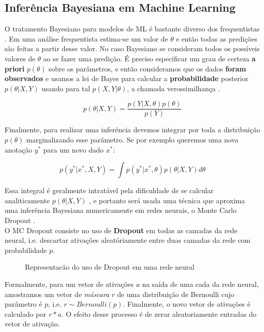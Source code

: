 \subsection{Inferência Bayesiana em Machine Learning}

O tratamento Bayesiano para modelos de ML é bastante diverso dos frequentistas \citep{dlbook}.
Em uma análise frequentista estima-se um valor de $\theta$ e então todas as
predições são feitas a partir desse valor. No caso Bayesiano se consideram todos
os possíveis valores de $\theta$ ao se fazer uma predição. É preciso especificar
um grau de certeza \textbf{a priori} $p(\theta)$ sobre os parâmetros, e então
consideramos que os dados \textbf{foram observados} e usamos a lei de Bayes para
calcular a \textbf{probabilidade} posterior $p(\theta | X,Y)$ usando para tal
$p(X,Y | \theta)$, a chamada verossimilhança \citep{bayesml}. 

\[    p(\theta | X,Y) = \frac{p(Y| X,\theta) p(\theta)}{p(Y)}   \]

Finalmente, para realizar uma inferência devemos integrar por toda a distribuição $p(\theta)$ marginalizando esse parâmetro. Se por exemplo queremos uma nova anotação $y^*$ para um novo dado $x^*$:

\[ p(y^* | x^* , X,Y) = \int  p(y^* | x^*,\theta) p(\theta | X,Y)  d\theta \]

Essa integral é geralmente intratável pela dificuldade de se calcular
analiticamente $p(\theta | X,Y)$ \citep{ubertime}, e portanto será usada uma
técnica que aproxima uma inferência Bayesiana numericamente em redes neurais, o Monte Carlo
Dropout \citep{dropbayes}. \\



O MC Dropout consiste no uso de \textbf{Dropout} em todas as camadas da rede
neural, i.e. descartar ativações aleatóriamente entre duas camadas da rede com
probabilidade $p$.\\

\begin{figure}
  
  \label{fig:dropout}
  \caption{Representacão do uso de Dropout em uma rede neural}
\end{figure}

Formalmente, para um vetor de ativações $a$ na saída de uma
cada da rede neural, amostramos um vetor de \textit{máscara} $r$ de uma
distribuição de Bernoulli cujo parâmetro é $p$, i.e. $r \sim Bernoulli(p)$.
Finalmente, o novo vetor de ativações é calculado por $r * a$. O efeito desse
processo é de zerar aleatoriamente entradas do vetor de ativação.
\\ 

